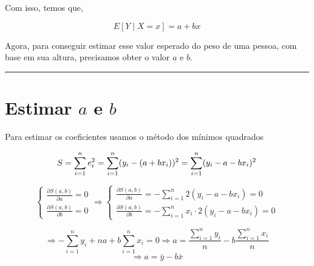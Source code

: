 \documentclass[
]{book}
\begin{document}
Com isso, temos que,

\[
E[Y \mid X = x] = a + bx
\]

Agora, para conseguir estimar esse valor esperado do peso de uma pessoa, com base em sua altura, precisamos obter o valor \(a\) e \(b\).

\begin{center}\rule{0.5\linewidth}{0.5pt}\end{center}

\section{\texorpdfstring{Estimar \(a\) e \(b\)}{Estimar a e b}}\label{estimar-a-e-b}

Para estimar os coeficientes usamos o método dos mínimos quadrados

\[
S = \sum_{i=1}^{n} e_i^2 = \sum_{i=1}^{n} (y_i - (a + bx_i))^2 = \sum_{i=1}^{n} (y_i - a - bx_i)^2\\
\]

\[
\left\{
  \begin{array}{l}
    \frac{\partial S(a, b)}{\partial a} = 0 \\
    \frac{\partial S(a, b)}{\partial b} = 0
  \end{array}
\right.
\Longrightarrow
\left\{
  \begin{array}{l}
    \frac{\partial S(a, b)}{\partial a} = - \sum_{i=1}^{n} 2(y_i - a - b x_i) = 0 \\
    \frac{\partial S(a, b)}{\partial b} = - \sum_{i=1}^{n} x_i \cdot 2(y_i - a - b x_i) = 0
  \end{array}
\right.
\]

\[
\Longrightarrow 
- \sum_{i=1}^{n} y_i + n a + b \sum_{i=1}^{n} x_i = 0
\Longrightarrow
a = \frac{\sum_{i=1}^{n} y_i}{n} - b \frac{\sum_{i=1}^{n} x_i}{n}
\]
\[
\Longrightarrow
a = \bar{y} - b\bar{x}
\]

  
\end{document}
